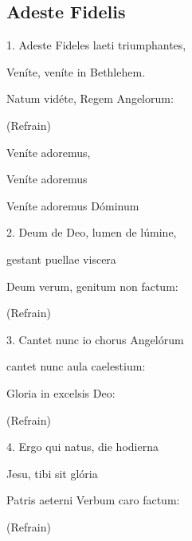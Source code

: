 \subsection{Adeste Fidelis}\label{adeste}
\begin{description}[nosep,leftmargin=\parindent,labelsep=0pt]
\item 1. Adeste Fideles laeti triumphantes, 
\item Veníte, veníte in Bethlehem. 
\item Natum vidéte, Regem Angelorum: 
\vspace{1.5ex}
\item (Refrain) 
\item Veníte adoremus, 
\item Veníte adoremus 
\item Veníte adoremus Dóminum 
\vspace{1.5ex}
\item 2. Deum de Deo, lumen de lúmine, 
\item gestant puellae viscera 
\item Deum verum, genitum non factum: 
\item (Refrain) 
\vspace{1.5ex}
\item 3. Cantet nunc io chorus Angelórum 
\item cantet nunc aula caelestium: 
\item Gloria in excelsis Deo: 
\item (Refrain) 
\vspace{1.5ex}
\item 4. Ergo qui natus, die hodierna 
\item Jesu, tibi sit glória 
\item Patris aeterni Verbum caro factum: 
\item (Refrain) 
\end{description}
